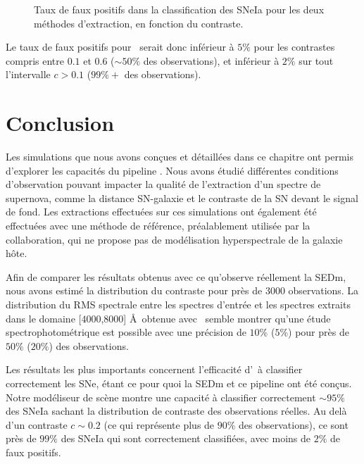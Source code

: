 \documentclass[../main/main.tex]{subfiles}
\begin{document}
\begin{figure}[ht]
  \centering
  \caption[Taux de faux positifs dans la classification des SNeIa.]{Taux de
    faux positifs dans la classification des SNeIa pour les deux
    méthodes d'extraction, en fonction du contraste.}
  \label{fig:falsepositivesIa}
\end{figure}

Le taux de faux positifs pour \hypergal\ serait donc inférieur à $5\%$
pour les contrastes compris entre $0.1$ et $0.6$ ($\sim50\%$ des observations), et inférieur à $2\%$
sur tout l'intervalle $c>0.1$ ($99\%+$ des observations).

\clearpage
\section*{Conclusion}

Les simulations que nous avons conçues et détaillées dans ce chapitre ont permis
d'explorer les capacités du pipeline \hypergal. Nous avons étudié
différentes conditions d'observation pouvant impacter la qualité de
l'extraction d'un spectre de supernova, comme la distance SN-galaxie et le contraste de la SN devant
le signal de fond. Les extractions effectuées sur ces simulations ont
également été effectuées avec une méthode de référence, préalablement
utilisée par la collaboration, qui ne propose pas de modélisation
hyperspectrale de la galaxie hôte.

Afin de comparer les résultats obtenus avec ce qu'observe réellement la
SEDm, nous avons estimé la distribution du contraste pour près de $3000$
observations. La distribution du RMS spectrale entre les spectres
d'entrée et les spectres extraits dans le domaine [$4000$,$8000$] \AA\ obtenue avec \hypergal\ semble
montrer qu'une étude spectrophotométrique est possible avec une précision de $10\%$ ($5\%$)
pour près de $50\%$ ($20\%$) des observations.

Les résultats les plus importants concernent l'efficacité d'\hypergal\ à classifier
correctement les SNe, étant ce pour quoi la SEDm et ce
pipeline ont été conçus. Notre modéliseur de scène montre une
capacité à classifier correctement $\sim95\%$ des SNeIa sachant la
distribution de contraste des observations réelles. Au delà d'un
contraste $c\sim0.2$ (ce qui représente plus de $90\%$ des observations), ce sont près de $99\%$ des SNeIa qui sont
correctement classifiées, avec moins de $2\%$ de faux positifs.
\end{document}
